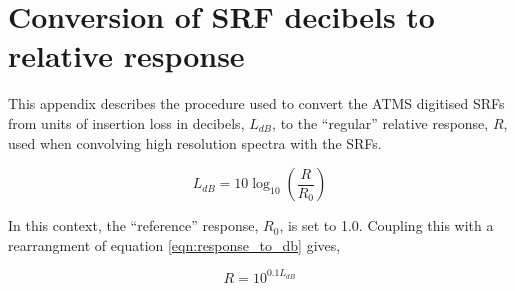 \section{Conversion of SRF decibels to relative response}
\label{app:db_to_response}
This appendix describes the procedure used to convert the ATMS digitised SRFs from units of insertion loss in decibels, $L_{dB}$, to the ``regular'' relative response, $R$, used when convolving high resolution spectra with the SRFs.

\begin{equation}
  L_{dB} = 10\log_{10}\left(\displaystyle\frac{R}{R_0}\right)
  \label{eqn:response_to_db}
\end{equation}

In this context, the ``reference'' response, $R_0$, is set to 1.0. Coupling this with a rearrangment of equation \ref{eqn:response_to_db} gives,

\begin{equation}
  R = 10^{0.1L_{dB}}
  \label{eqn:db_to_response}
\end{equation}


